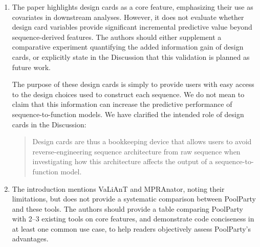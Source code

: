 \documentclass[11pt]{article}
\newenvironment{response}{\par\color{responseblue}}{\par}
\newenvironment{msquote}
  {\begin{quote}\color{quotedtext}\noindent\ignorespaces}
  {\end{quote}}
\begin{document}
\begin{enumerate}
\item The paper highlights design cards as a core feature, emphasizing their use
as covariates in downstream analyses. However, it does not evaluate whether
design card variables provide significant incremental predictive value beyond
sequence-derived features. The authors should either supplement a comparative
experiment quantifying the added information gain of design cards, or explicitly
state in the Discussion that this validation is planned as future work.

\begin{response}
The purpose of these design cards is simply to provide users with easy access to the design choices used to construct each sequence. We do not mean to claim that this information can increase the predictive performance of sequence-to-function models. We have clarified the intended role of design cards in the Discussion:
  \begin{msquote}
    Design cards are thus a bookkeeping device that allows users to avoid reverse-engineering sequence architecture from raw sequence when investigating how this architecture affects the output of a sequence-to-function model.
  \end{msquote}
\end{response}

\item The introduction mentions VaLiAnT and MPRAnator, noting their limitations,
but does not provide a systematic comparison between PoolParty and these tools.
The authors should provide a table comparing PoolParty with 2--3 existing tools
on core features, and demonstrate code conciseness in at least one common use
case, to help readers objectively assess PoolParty's advantages.


\end{enumerate}
\end{document}
